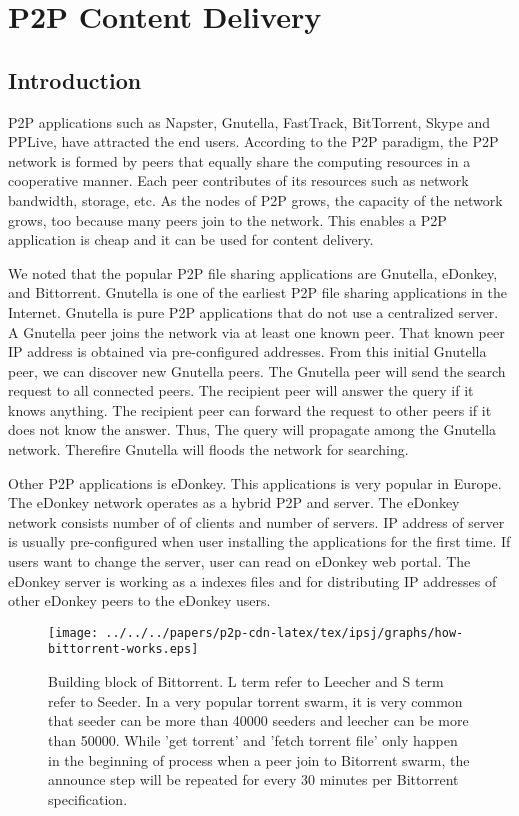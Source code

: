 \chapter{P2P Content Delivery}
\section{Introduction}

P2P applications such as Napster, Gnutella, FastTrack, BitTorrent, Skype and PPLive, have attracted the end users.
According to the P2P paradigm, the P2P network is formed by peers that equally share the computing resources in a cooperative manner.
Each peer contributes of its resources such as network bandwidth, storage, etc. 
As the nodes of P2P grows, the capacity of the network grows, too because many peers join to the network. 
This enables a P2P application is cheap and it can be used for content delivery.  

We noted that the popular P2P file sharing applications are Gnutella, eDonkey, and Bittorrent.  
Gnutella is one of the earliest P2P file sharing applications in the Internet.
Gnutella is pure P2P applications that do not use a centralized server.
A Gnutella peer joins the network via at least one known peer.
That known peer IP address is obtained via pre-configured addresses. 
From this initial Gnutella peer, we can discover new Gnutella peers.
The Gnutella peer will send the search request to all connected peers. 
The recipient peer will answer the query if it knows anything. 
The recipient peer can forward the request to other peers if it does not know the answer.
Thus, The query will propagate among the Gnutella network.
Therefire Gnutella will floods the network for searching.

Other P2P applications is eDonkey.  
This applications is very popular in Europe. 
The eDonkey network operates as a hybrid P2P and server. 
The eDonkey network consists number of of clients and number of servers. 
IP address of server is usually pre-configured when user installing the applications for the first time.  
If users want to change the server, user can read on eDonkey web portal.
The eDonkey server is working as a indexes files and for distributing IP addresses of other eDonkey peers to the eDonkey users.

\begin{figure}[tb]
\begin{center}
\texttt{[image: ../../../papers/p2p-cdn-latex/tex/ipsj/graphs/how-bittorrent-works.eps]}
\end{center}
\caption{Building block of Bittorrent. 
L term refer to Leecher and S term refer to Seeder. 
In a very popular torrent swarm, it is very common that seeder can be more than 40000 seeders and leecher can be more than 50000.
While 'get torrent' and 'fetch torrent file' only happen in the beginning of process when a peer join to Bitorrent swarm, the announce step will be repeated for every 30 minutes per Bittorrent specification.} 
\label{fig:bittorrentblock}
\end{figure}

